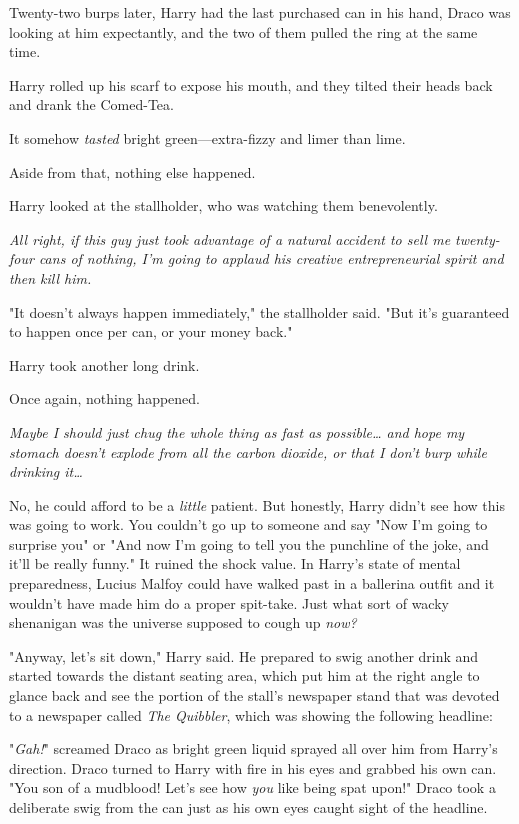 Twenty-two burps later, Harry had the last purchased can in his hand, Draco was
looking at him expectantly, and the two of them pulled the ring at the same
time.

Harry rolled up his scarf to expose his mouth, and they tilted their heads back
and drank the Comed-Tea.

It somehow \emph{tasted} bright green---extra-fizzy and limer than lime.

Aside from that, nothing else happened.

Harry looked at the stallholder, who was watching them benevolently.

\emph{All right, if this guy just took advantage of a natural accident to sell
me twenty-four cans of nothing, I'm going to applaud his creative
entrepreneurial spirit and then kill him.}

"It doesn't always happen immediately," the stallholder said. "But it's
guaranteed to happen once per can, or your money back."

Harry took another long drink.

Once again, nothing happened.

\emph{Maybe I should just chug the whole thing as fast as possible{\ldots} and
hope my stomach doesn't explode from all the carbon dioxide, or that I don't
burp while drinking it{\ldots}}

No, he could afford to be a \emph{little} patient. But honestly, Harry didn't
see how this was going to work. You couldn't go up to someone and say "Now I'm
going to surprise you" or "And now I'm going to tell you the punchline of the
joke, and it'll be really funny." It ruined the shock value. In Harry's state
of mental preparedness, Lucius Malfoy could have walked past in a ballerina
outfit and it wouldn't have made him do a proper spit-take. Just what sort of
wacky shenanigan was the universe supposed to cough up \emph{now?}

"Anyway, let's sit down," Harry said. He prepared to swig another drink and
started towards the distant seating area, which put him at the right angle to
glance back and see the portion of the stall's newspaper stand that was devoted
to a newspaper called \emph{The Quibbler}, which was showing the following
headline:


"\emph{Gah!}" screamed Draco as bright green liquid sprayed all over him from
Harry's direction. Draco turned to Harry with fire in his eyes and grabbed his
own can. "You son of a mudblood! Let's see how \emph{you} like being spat
upon!" Draco took a deliberate swig from the can just as his own eyes caught
sight of the headline.

